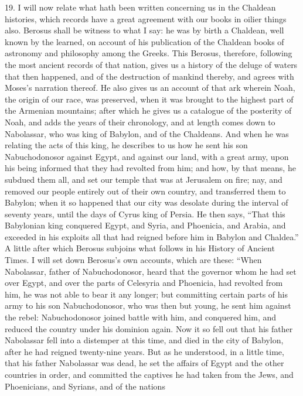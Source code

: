 19. I will now relate what hath been written concerning us in the Chaldean
histories, which records have a great agreement with our books in oilier
things also. Berosus shall be witness to what I say: he was by birth a
Chaldean, well known by the learned, on account of his publication of the
Chaldean books of astronomy and philosophy among the Greeks. This Berosus,
therefore, following the most ancient records of that nation, gives us a
history of the deluge of waters that then happened, and of the destruction
of mankind thereby, and agrees with Moses's narration thereof. He also
gives us an account of that ark wherein Noah, the origin of our race, was
preserved, when it was brought to the highest part of the Armenian
mountains; after which he gives us a catalogue of the posterity of Noah,
and adds the years of their chronology, and at length comes down to
Nabolassar, who was king of Babylon, and of the Chaldeans. And when he was
relating the acts of this king, he describes to us how he sent his son
Nabuchodonosor against Egypt, and against our land, with a great army,
upon his being informed that they had revolted from him; and how, by that
means, he subdued them all, and set our temple that was at Jerusalem on
fire; nay, and removed our people entirely out of their own country, and
transferred them to Babylon; when it so happened that our city was
desolate during the interval of seventy years, until the days of Cyrus
king of Persia. He then says, ``That this Babylonian king conquered Egypt,
and Syria, and Phoenicia, and Arabia, and exceeded in his exploits all
that had reigned before him in Babylon and Chaldea.'' A little after which
Berosus subjoins what follows in his History of Ancient Times. I will set
down Berosus's own accounts, which are these: ``When Nabolassar, father of
Nabuchodonosor, heard that the governor whom he had set over Egypt, and
over the parts of Celesyria and Phoenicia, had revolted from him, he was
not able to bear it any longer; but committing certain parts of his army
to his son Nabuchodonosor, who was then but young, he sent him against the
rebel: Nabuchodonosor joined battle with him, and conquered him, and
reduced the country under his dominion again. Now it so fell out that his
father Nabolassar fell into a distemper at this time, and died in the city
of Babylon, after he had reigned twenty-nine years. But as he understood,
in a little time, that his father Nabolassar was dead, he set the affairs
of Egypt and the other countries in order, and committed the captives he
had taken from the Jews, and Phoenicians, and Syrians, and of the nations
